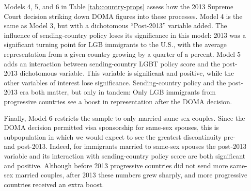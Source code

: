 \documentclass[
  11pt,
]{article}
\begin{document}
Models 4, 5, and 6 in Table \ref{tab:country-props} assess how the 2013 Supreme Court decision striking down DOMA figures into these processes. Model 4 is the same as Model 3, but with a dichotomous ``Post-2013'' variable added. The influence of sending-country policy loses its significance in this model: 2013 was a significant turning point for LGB immigrants to the U.S., with the average representation from a given country growing by a quarter of a percent. Model 5 adds an interaction between sending-country LGBT policy score and the post-2013 dichotomous variable. This variable is significant and positive, while the other variables of interest lose significance. Sending-country policy and the post-2013 era both matter, but only in tandem: Only LGB immigrants from progressive countries see a boost in representation after the DOMA decision.

Finally, Model 6 restricts the sample to only married same-sex couples. Since the DOMA decision permitted visa sponsorship for same-sex spouses, this is subpopulation in which we would expect to see the greatest discontinuity pre- and post-2013. Indeed, for immigrants married to same-sex spouses the post-2013 variable and its interaction with sending-country policy score are both significant and positive. Although before 2013 progressive countries did not send more same-sex married couples, after 2013 these numbers grew sharply, and more progressive countries received an extra boost.
\end{document}
